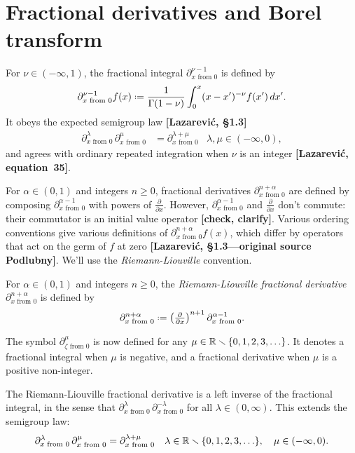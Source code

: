 \documentclass[11pt,a4paper,twoside,leqno,noamsfonts]{amsart}
\numberwithin{equation}{section}
\begin{document}
\section{Fractional derivatives and Borel transform}
For $\nu \in (-\infty, 1)$, the fractional integral $\partial^{\nu-1}_{x \text{ from } 0}$ is defined by
\[ \partial^{\nu-1}_{x \text{ from } 0} f(x) \defeq \frac{1}{\Gamma(1-\nu)} \int_0^x (x-x')^{-\nu} f(x')\,dx'. \]
It obeys the expected semigroup law \textbf{[Lazarevi\'{c}, \S 1.3]}
\begin{align*}
\partial^{\lambda}_{x \text{ from } 0}\,\partial^{\mu}_{x \text{ from } 0} & = \partial^{\lambda+\mu}_{x \text{ from } 0} & \lambda, \mu \in (-\infty, 0),
\end{align*}
and agrees with ordinary repeated integration when $\nu$ is an integer \textbf{[Lazarevi\'{c}, equation~35]}.

For $\alpha \in (0, 1)$ and integers $n \ge 0$, fractional derivatives $\partial^{n+\alpha}_{x \text{ from } 0}$ are defined by composing $\partial^{\alpha-1}_{x \text{ from } 0}$ with powers of $\tfrac{\partial}{\partial x}$. However, $\partial^{\alpha-1}_{x \text{ from } 0}$ and $\tfrac{\partial}{\partial x}$ don't commute: their commutator is an initial value operator \textbf{[check, clarify]}. Various ordering conventions give various definitions of $\partial^{n+\alpha}_{x \text{ from } 0} f(x)$, which differ by operators that act on the germ of $f$ at zero \textbf{[Lazarevi\'{c}, \S 1.3---original source Podlubny]}. We'll use the {\em Riemann-Liouville} convention.
\begin{definition}
For $\alpha \in (0, 1)$ and integers $n \ge 0$, the {\em Riemann-Liouville fractional derivative} $\partial^{n+\alpha}_{x \text{ from } 0}$ is defined by
\[ \partial^{n+\alpha}_{x \text{ from } 0} \defeq \left(\tfrac{\partial}{\partial x}\right)^{n+1} \partial^{\alpha-1}_{x \text{ from } 0}. \]
\end{definition}
The symbol $\partial^\mu_{\zeta \text{ from } 0}$ is now defined for any $\mu \in \mathbb R \smallsetminus \{0, 1, 2, 3, \ldots\}$. It denotes a fractional integral when $\mu$ is negative, and a fractional derivative when $\mu$ is a positive non-integer.

The Riemann-Liouville fractional derivative is a left inverse of the fractional integral, in the sense that $\partial^\lambda_{x \text{ from } 0}\,\partial^{-\lambda}_{x \text{ from } 0}$ for all $\lambda \in (0, \infty)$. This extends the semigroup law:
\begin{align*}
\partial^{\lambda}_{x \text{ from } 0}\,\partial^{\mu}_{x \text{ from } 0} & = \partial^{\lambda+\mu}_{x \text{ from } 0} & \lambda \in \mathbb R \smallsetminus \{0, 1, 2, 3, \ldots\},\quad\mu \in (-\infty, 0).
\end{align*}
\end{document}
